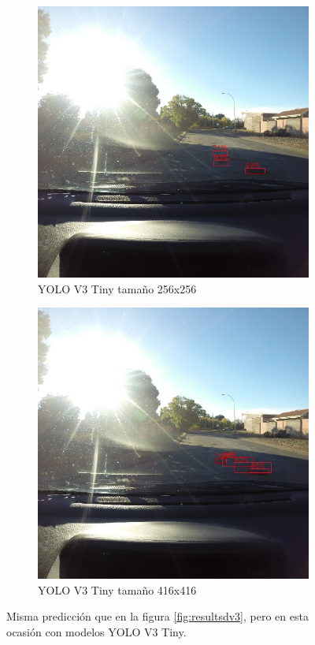 \begin{figure}[H]
	\centering
	\begin{subfigure}[h]{0.45\linewidth}
		\includegraphics[width=\linewidth]{images/results_d_yolo_v3_tiny_256.jpg}
		\caption{YOLO V3 Tiny tamaño 256x256}
	\end{subfigure}
	\begin{subfigure}[h]{0.45\linewidth}
		\includegraphics[width=\linewidth]{images/results_d_yolo_v3_tiny_416.jpg}
		\caption{YOLO V3 Tiny tamaño 416x416}
	\end{subfigure}
	\caption{Misma predicción que en la figura \ref{fig:resultsdv3}, pero en esta ocasión con modelos YOLO V3 Tiny.}
	\label{fig:resultsdv3tiny}
\end{figure}

